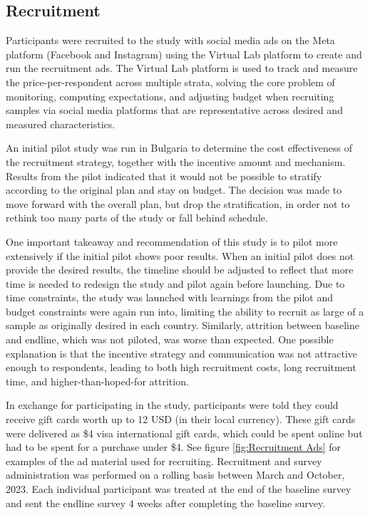 \documentclass{article}
\begin{document}
\subsection*{Recruitment}

Participants were recruited to the study with social media ads on the Meta platform (Facebook and Instagram) using the Virtual Lab platform to create and run the recruitment ads. The Virtual Lab platform is used to track and measure the price-per-respondent across multiple strata, solving the core problem of monitoring, computing expectations, and adjusting budget when recruiting samples via social media platforms that are representative across desired and measured characteristics.

An initial pilot study was run in Bulgaria to determine the cost effectiveness of the recruitment strategy, together with the incentive amount and mechanism. Results from the pilot indicated that it would not be possible to stratify according to the original plan and stay on budget. The decision was made to move forward with the overall plan, but drop the stratification, in order not to rethink too many parts of the study or fall behind schedule.

One important takeaway and recommendation of this study is to pilot more extensively if the initial pilot shows poor results. When an initial pilot does not provide the desired results, the timeline should be adjusted to reflect that more time is needed to redesign the study and pilot again before launching. Due to time constraints, the study was launched with learnings from the pilot and budget constraints were again run into, limiting the ability to recruit as large of a sample as originally desired in each country. Similarly, attrition between baseline and endline, which was not piloted, was worse than expected. One possible explanation is that the incentive strategy and communication was not attractive enough to respondents, leading to both high recruitment costs, long recruitment time, and higher-than-hoped-for attrition.

In exchange for participating in the study, participants were told they could receive gift cards worth up to 12 USD (in their local currency). These gift cards were delivered as \$4 visa international gift cards, which could be spent online but had to be spent for a purchase under \$4. See figure \ref{fig:Recruitment Ads} for examples of the ad material used for recruiting. Recruitment and survey administration was performed on a rolling basis between March and October, 2023. Each individual participant was treated at the end of the baseline survey and sent the endline survey 4 weeks after completing the baseline survey.
\end{document}
